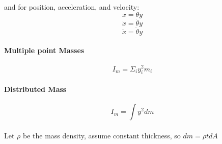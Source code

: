 \paragraph{}
\paragraph{} and for position, acceleration, and velocity:
\begin{equation}
    x = \theta y
\end{equation}
\begin{equation}
    \dot{x} = \dot{\theta} y
\end{equation}
\begin{equation}
    \ddot{x} = \ddot{\theta} y
\end{equation}
\paragraph{Multiple point Masses} 
\begin{equation}
    I_m = \Sigma_i y_i^2 m_i
\end{equation}
\paragraph{Distributed Mass} 
\begin{equation}
    I_m = \int y^2 d m
\end{equation}
\paragraph{} Let $\rho$ be the mass density, assume constant thickness, so $dm = \rho t dA$
